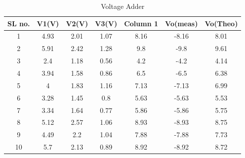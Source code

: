 \documentclass[10pt]{scrartcl}
\theoremstyle{definition}
\begin{document}
\begin{table}[!ht]
    \centering
    \begin{tabular}{|c|c|c|c|c|c|c|}
    \hline
        \textbf{SL no.} & \textbf{V1(V)} & \textbf{V2(V)} & \textbf{V3(V)} & \textbf{Column 1} & \textbf{Vo(meas)} & \textbf{Vo(Theo)} \\ \hline
        1 & 4.93 & 2.01 & 1.07 & 8.16 & -8.16 & 8.01 \\ \hline
        2 & 5.91 & 2.42 & 1.28 & 9.8 & -9.8 & 9.61 \\ \hline
        3 & 2.4 & 1.18 & 0.56 & 4.2 & -4.2 & 4.14 \\ \hline
        4 & 3.94 & 1.58 & 0.86 & 6.5 & -6.5 & 6.38 \\ \hline
        5 & 4 & 1.83 & 1.16 & 7.13 & -7.13 & 6.99 \\ \hline
        6 & 3.28 & 1.45 & 0.8 & 5.63 & -5.63 & 5.53 \\ \hline
        7 & 3.34 & 1.64 & 0.77 & 5.86 & -5.86 & 5.75 \\ \hline
        8 & 5.12 & 2.57 & 1.06 & 8.93 & -8.93 & 8.75 \\ \hline
        9 & 4.49 & 2.2 & 1.04 & 7.88 & -7.88 & 7.73 \\ \hline
        10 & 5.7 & 2.13 & 0.89 & 8.92 & -8.92 & 8.72 \\ \hline
    \end{tabular}
    \caption{Voltage Adder}
\end{table}
\end{document}
